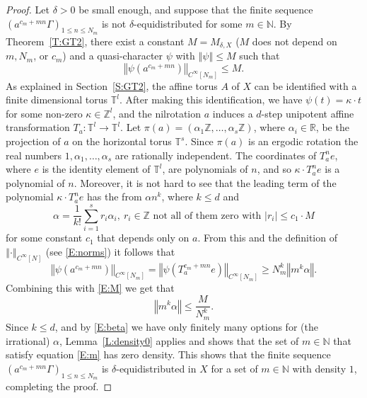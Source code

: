 \documentclass[11pt]{amsart}
\newcommand{\T}{\mathbb{T}}
\newcommand{\Q}{\mathbb{Q}}
\newcommand{\R}{\mathbb{R}}
\newcommand{\N}{\mathbb{N}}
\newcommand{\Z}{\mathbb{Z}}
\newcommand{\norm}[1]{\left\Vert #1\right\Vert}
\theoremstyle{plain}
\theoremstyle{definition}
\theoremstyle{remark}
\begin{document}
\begin{proof}
  Let $\delta>0$ be small enough, and suppose that the finite sequence
  $(a^{c_m+mn}\Gamma)_{1\leq n\leq N_m}$ is not
  $\delta$-equidistributed for some $m\in\N$.  By  Theorem~\ref{T:GT2}, there
   exist a constant $M=M_{\delta,X}$ ($M$ does not depend on $m, N_m$, or
  $c_m$) and a quasi-character $\psi$ with $\norm{\psi}\leq M$ such
  that
  \begin{equation}\label{E:M}
    \norm{\psi(a^{c_m+mn})}_{C^\infty[N_m]}\leq M.
  \end{equation}
  As explained in Section~\ref{S:GT2}, the affine torus $A$ of $X$ can
  be identified with a finite dimensional torus $\T^l$. After making
  this identification, we have $\psi(t)=\kappa\cdot t$ for some
  non-zero $\kappa\in \Z^l$, and the nilrotation $a$ induces a $d$-step
  unipotent affine transformation $T_a\colon \T^l\to \T^l$.
Let $\pi(a)=(\alpha_1\Z,\ldots,\alpha_s\Z)$,  where $\alpha_i\in \R$,  be the projection of
$a$ on the horizontal torus $\T^s$.
Since $\pi(a)$ is an ergodic rotation the real numbers $1, \alpha_1,\ldots,\alpha_s$ are rationally independent.
The coordinates of $T_a^n e$, where $e$ is the identity element of $\T^l$,
are polynomials of $n$, and so $\kappa\cdot T_a^ne$ is a
polynomial of $n$. Moreover, it is not hard to see that the leading
term of the polynomial $\kappa\cdot T_a^ne$ has the from $ \alpha n^k$,
where $k\leq d$ and
\begin{equation}\label{E:beta}
  \alpha=\frac{1}{k!}\sum_{i=1}^s r_i\alpha_i, \ r_i\in \Z \text{ not all of them zero with } |r_i|\leq c_1\cdot M
\end{equation}
for some constant $c_1$ that depends only on $a$. From this and the
definition of $\norm{\cdot}_{C^\infty[N]}$ (see \eqref{E:norms}) it
follows that
$$
\norm{\psi(a^{c_m+mn})}_{C^\infty[N_m]}=\norm{\psi(T_a^{c_m+mn}e)}_{C^\infty[N_m]}\geq
N_m^k \norm{ m^k\alpha}.
$$
Combining this with \eqref{E:M} we get that
\begin{equation}\label{E:m}
  \norm{m^k\alpha}\leq \frac{M}{N^k_m}.
\end{equation}
Since $k\leq d$, and by \eqref{E:beta} we have only finitely many
options for (the irrational) $\alpha$, Lemma~\ref{L:density0} applies and
shows that the set of $m\in\N$ that satisfy equation \eqref{E:m} has
zero density. This shows that the finite sequence
$(a^{c_m+mn}\Gamma)_{1\leq n\leq N_m}$ is $\delta$-equidistributed in
$X$ for a set of $m\in\N$ with density $1$, completing the proof.
\end{proof}
\end{document}
